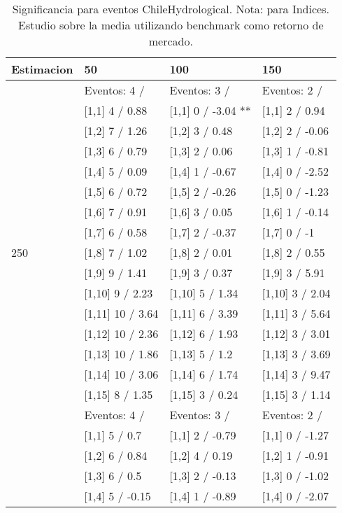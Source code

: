 \begin{table}

\caption{Significancia para eventos ChileHydrological. Nota: para Indices. Estudio sobre la media utilizando benchmark como retorno de mercado.}
\centering
\begin{tabular}[t]{llll}
\toprule
Estimacion & 50 & 100 & 150\\
\midrule
 & Eventos:  4 / & Eventos:  3 / & Eventos:  2 /\\
 & {}[1,1] 4  / 0.88 & {}[1,1] 0  / -3.04 ** & {}[1,1] 2  / 0.94\\
 & {}[1,2] 7  / 1.26 & {}[1,2] 3  / 0.48 & {}[1,2] 2  / -0.06\\
 & {}[1,3] 6  / 0.79 & {}[1,3] 2  / 0.06 & {}[1,3] 1  / -0.81\\
 & {}[1,4] 5  / 0.09 & {}[1,4] 1  / -0.67 & {}[1,4] 0  / -2.52\\
\addlinespace
 & {}[1,5] 6  / 0.72 & {}[1,5] 2  / -0.26 & {}[1,5] 0  / -1.23\\
 & {}[1,6] 7  / 0.91 & {}[1,6] 3  / 0.05 & {}[1,6] 1  / -0.14\\
 & {}[1,7] 6  / 0.58 & {}[1,7] 2  / -0.37 & {}[1,7] 0  / -1\\
250 & {}[1,8] 7  / 1.02 & {}[1,8] 2  / 0.01 & {}[1,8] 2  / 0.55\\
 & {}[1,9] 9  / 1.41 & {}[1,9] 3  / 0.37 & {}[1,9] 3  / 5.91\\
\addlinespace
 & {}[1,10] 9  / 2.23 & {}[1,10] 5  / 1.34 & {}[1,10] 3  / 2.04\\
 & {}[1,11] 10  / 3.64 & {}[1,11] 6  / 3.39 & {}[1,11] 3  / 5.64\\
 & {}[1,12] 10  / 2.36 & {}[1,12] 6  / 1.93 & {}[1,12] 3  / 3.01\\
 & {}[1,13] 10  / 1.86 & {}[1,13] 5  / 1.2 & {}[1,13] 3  / 3.69\\
 & {}[1,14] 10  / 3.06 & {}[1,14] 6  / 1.74 & {}[1,14] 3  / 9.47\\
\addlinespace
 & {}[1,15] 8  / 1.35 & {}[1,15] 3  / 0.24 & {}[1,15] 3  / 1.14\\
 & Eventos:  4 / & Eventos:  3 / & Eventos:  2 /\\
 & {}[1,1] 5  / 0.7 & {}[1,1] 2  / -0.79 & {}[1,1] 0  / -1.27\\
 & {}[1,2] 6  / 0.84 & {}[1,2] 4  / 0.19 & {}[1,2] 1  / -0.91\\
 & {}[1,3] 6  / 0.5 & {}[1,3] 2  / -0.13 & {}[1,3] 0  / -1.02\\
\addlinespace
 & {}[1,4] 5  / -0.15 & {}[1,4] 1  / -0.89 & {}[1,4] 0  / -2.07\\

\end{tabular}
\end{table}
